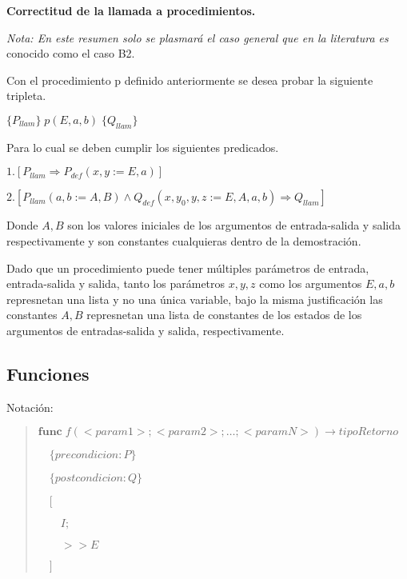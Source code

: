\documentclass[hidelinks]{article}
\newenvironment{absolutelynopagebreak}
{\Needspace{10\baselineskip}\begin{quote}}
		{\end{quote}}
\begin{document}
\textbf{Correctitud de la llamada a procedimientos.}\par
\textit{Nota: En este resumen solo se plasmará el caso general que en la literatura es}
conocido como el caso B2.\par
Con el procedimiento p definido anteriormente se desea probar la siguiente
tripleta.\par
\begin{center}
	$\{P_{llam}\} \; p(E, a, b) \; \{Q_{llam}\}$
\end{center}\par
Para lo cual se deben cumplir los siguientes predicados.\par
$1.[P_{llam} \Rightarrow P_{def}(x,y := E, a)]$\par
$2.[P_{llam}(a,b := A,B) \land Q_{def}(x,y_0,y,z := E, A, a, b) \Rightarrow Q_{llam}]$\par

Donde $A,B$ son los valores iniciales de los argumentos de entrada-salida y
salida respectivamente y son constantes cualquieras dentro de la demostración.\par

Dado que un procedimiento puede tener múltiples parámetros de entrada,
entrada-salida y salida, tanto los parámetros $x,y,z$ como los argumentos
$E,a,b$ represnetan una lista y no una única variable, bajo la misma
justificación las constantes $A,B$ represnetan una lista de constantes de los
estados de los argumentos de entradas-salida y salida, respectivamente.\par

\subsection{Funciones}\par
Notación:\par
\begin{absolutelynopagebreak}
	$\textbf{func} \; f(<param1>; <param2>; \dots; <paramN>) \rightarrow tipoRetorno$ \par
	$\quad \{precondicion: P\}$ \par
	$\quad \{postcondicion: Q\}$\par
	$\quad [$\par
			$\qquad I;$\par
			$\qquad >> E$\par
			$\quad ]$\par
\end{absolutelynopagebreak}
\end{document}
